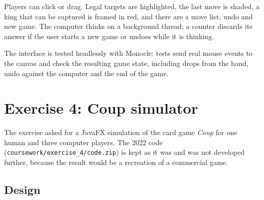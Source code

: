 \documentclass[11pt,a4paper]{article}
\begin{document}
Players can click or drag. Legal targets are highlighted, the last move is shaded, a king that can be captured is framed in red, and there are a move list, undo and new game. The computer thinks on a background thread; a counter discards its answer if the user starts a new game or undoes while it is thinking.

The interface is tested headlessly with Monocle: tests send real mouse events to the canvas and check the resulting game state, including drops from the hand, undo against the computer and the end of the game.

\section{Exercise 4: Coup simulator}

The exercise asked for a JavaFX simulation of the card game \emph{Coup} for one human and three computer players. The 2022 code (\texttt{coursework/exercise\_4/code.zip}) is kept as it was and was not developed further, because the result would be a recreation of a commercial game.

\subsection{Design}
\end{document}
